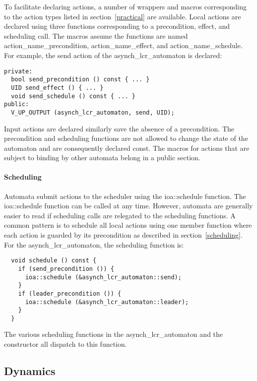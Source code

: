 To facilitate declaring actions, a number of wrappers and macros corresponding to the action types listed in section~\ref{practical} are available.
Local actions are declared using three functions corresponding to a precondition, effect, and scheduling call.
The macros assume the functions are named action\_name\_precondition, action\_name\_effect, and action\_name\_schedule.
For example, the send action of the asynch\_lcr\_automaton is declared:
\begin{lstlisting}
private:
  bool send_precondition () const { ... }
  UID send_effect () { ... }
  void send_schedule () const { ... }
public:
  V_UP_OUTPUT (asynch_lcr_automaton, send, UID);
\end{lstlisting}
Input actions are declared similarly save the absence of a precondition.
The precondition and scheduling functions are not allowed to change the state of the automaton and are consequently declared const.
The macros for actions that are subject to binding by other automata belong in a public section.

\paragraph*{Scheduling}
Automata submit actions to the scheduler using the ioa::schedule function.
The ioa::schedule function can be called at any time.
However, automata are generally easier to read if scheduling calls are relegated to the scheduling functions.
A common pattern is to schedule all local actions using one member function where each action is guarded by its precondition as described in section~\ref{scheduling}.
For the asynch\_lcr\_automaton, the scheduling function is:
\begin{lstlisting}
  void schedule () const {
    if (send_precondition ()) {
      ioa::schedule (&asynch_lcr_automaton::send);
    }
    if (leader_precondition ()) {
      ioa::schedule (&asynch_lcr_automaton::leader);
    }
  }
\end{lstlisting}
The various scheduling functions in the asynch\_lcr\_automaton and the constructor all dispatch to this function.

\subsection{Dynamics}

